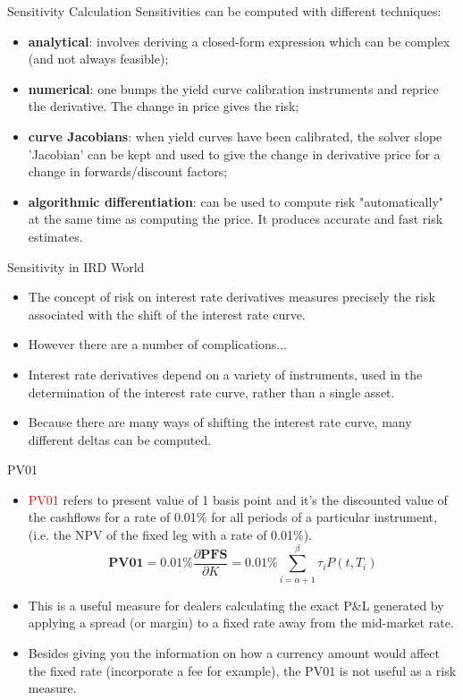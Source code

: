 \documentclass{beamer}
\begin{document}
\begin{frame}{Sensitivity Calculation}
Sensitivities can be computed with different techniques:
\begin{itemize}
	\item \textbf{analytical}: involves deriving a closed-form expression which can be complex (and not always feasible);
	\item \textbf{numerical}: one bumps the yield curve calibration instruments and reprice the derivative. The change in price gives the risk;
	\item \textbf{curve Jacobians}: when yield curves have been calibrated, the solver slope 'Jacobian' can be kept and used to give the change in derivative price for a change in forwards/discount factors;
	\item \textbf{algorithmic differentiation}: can be used to compute risk "automatically" at the same time as computing the price. It produces accurate and fast risk estimates.
\end{itemize}
\end{frame}

\begin{frame}{Sensitivity in IRD World}
\begin{itemize}
\item<1-> The concept of risk on interest rate derivatives measures precisely the risk associated with the shift of the interest rate curve. 
\item<2-> However there are a number of complications...
\item<2-> Interest rate derivatives depend on a variety of instruments, used in the determination of the interest rate curve, rather than a single asset.
\item<3-> Because there are many ways of shifting the interest rate curve, many different deltas can be computed. 
\end{itemize}
\end{frame}

\begin{frame}{PV01}
\begin{itemize}
    \item<1-> \textcolor{red}{PV01} refers to present value of 1 basis point and it's the discounted value of the cashflows for a rate of 0.01\% for all periods of a particular instrument, (i.e. the NPV of the fixed leg with a rate of 0.01\%).
	\begin{equation}
	   \textbf{PV01} = 0.01\% \frac{\partial \textbf{PFS}}{\partial K} = 0.01\% \sum_{i=\alpha+1}^\beta\tau_iP(t,T_i)
	\end{equation}
	\item<2-> This is a useful measure for dealers calculating the exact P\&L generated by applying a spread (or margin) to a fixed rate away from the mid-market rate.
   \item<3-> Besides giving you the information on how a currency amount would affect the fixed rate (incorporate a fee for example), the PV01 is not useful as a risk measure. 
\end{itemize}
\end{frame}
\end{document}

